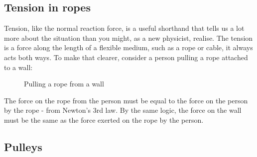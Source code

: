 \documentclass[a4paper,12pt]{book}
\def\rope#1{ \draw[black,line width=1.5] #1; \draw[rope] #1; }
\begin{document}
\subsection{Tension in ropes}
Tension, like the normal reaction force, is a useful shorthand that tells us a lot more about the situation than you might, as a new physicist, realise. The tension is a force along the length of a flexible medium, such as a rope or cable, it always acts both ways. To make that clearer, consider a person pulling a rope attached to a wall:
\begin{figure}
    \centering
    
 \caption{Pulling a rope from a wall}
    \label{fig:pullarope}
\end{figure}
The force on the rope from the person must be equal to the force on the person by the rope - from Newton's 3rd law. By the same logic, the force on the wall must be the same as the force exerted on the rope by the person.

\subsection*{Pulleys}
\end{document}
